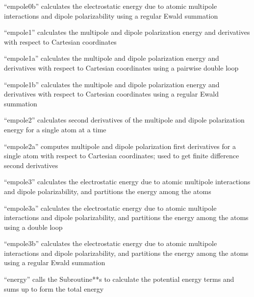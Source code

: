 \documentclass[letterpaper,11pt,english]{sphinxmanual}
\begin{document}
“empole0b” calculates the electrostatic energy due to atomic multipole interactions and dipole polarizability using a regular Ewald summation


“empole1” calculates the multipole and dipole polarization energy and derivatives with respect to Cartesian coordinates


“empole1a” calculates the multipole and dipole polarization energy and derivatives with respect to Cartesian coordinates using a pairwise double loop


“empole1b” calculates the multipole and dipole polarization energy and derivatives with respect to Cartesian coordinates using a regular Ewald summation


“empole2” calculates second derivatives of the multipole and dipole polarization energy for a single atom at a time


“empole2a” computes multipole and dipole polarization first derivatives for a single atom with respect to Cartesian coordinates; used to get finite difference second derivatives


“empole3” calculates the electrostatic energy due to atomic multipole interactions and dipole polarizability, and partitions the energy among the atoms


“empole3a” calculates the electrostatic energy due to atomic multipole interactions and dipole polarizability, and partitions the energy among the atoms using a double loop


“empole3b” calculates the electrostatic energy due to atomic multipole interactions and dipole polarizability, and partitions the energy among the atoms using a regular Ewald summation


“energy” calls the Subroutine**s to calculate the potential energy terms and sums up to form the total energy
\end{document}
